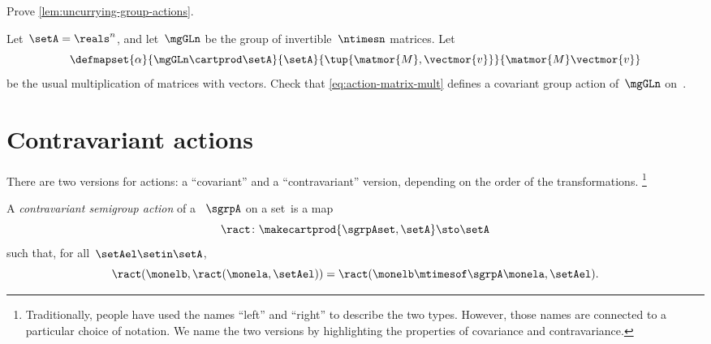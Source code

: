\vfill%


\begin{gradedexercise}
    \label{ex:UncurryingGroupActions}
    Prove \cref{lem:uncurrying-group-actions}.
\end{gradedexercise}

\begin{gradedexercise}
    \label{ex:MatrixMultAction}
    Let~$\setA = \reals^n$, and let~$\mgGLn$ be the group of invertible~$\ntimesn$ matrices.
    Let
    \begin{equation}
        \label{eq:action-matrix-mult}
        \defmapset{
            \alpha
        }{
            \mgGLn \cartprod \setA
        }{
            \setA
        }{
            \tup{\matmor{M}, \vectmor{v}}
        }{
            \matmor{M}\vectmor{v}
        }
    \end{equation}
    be the usual multiplication of matrices with vectors.
    Check that \cref{eq:action-matrix-mult} defines a covariant group action of~$\mgGLn$ on~\setA.
\end{gradedexercise}


\section{Contravariant actions}

There are two versions for actions: a ``covariant'' and a ``contravariant'' version, depending on the order of the transformations.
\footnote{
    Traditionally, people have used the names ``left'' and ``right'' to describe the two types.
    However, those names are connected to a particular choice of notation.
    We name the two versions by highlighting the properties of covariance and contravariance.
}

\begin{ctdefinition}
    \label{def:semigroup-contra-action-prelim}
    A \emph{contravariant semigroup action} of a ~$\sgrpA$ on a set~\setA is a map
    \begin{equation}
        \label{eq:ract}
        \ract \colon \makecartprod{\sgrpAset, \setA} \sto \setA
    \end{equation}
    such that, for all~$\setAel \setin \setA$,
    \begin{equation}
        \label{eq:ract1cond}
        \ract(\monelb, \ract(\monela, \setAel)) = \ract(\monelb \mtimesof\sgrpA \monela, \setAel).
    \end{equation}
\end{ctdefinition}

